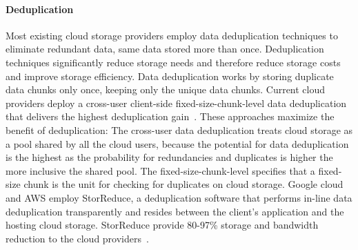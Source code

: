 \paragraph{Deduplication}
Most existing cloud storage
providers employ data deduplication techniques to eliminate redundant data,
same data stored more than once.  Deduplication techniques significantly reduce
storage needs and therefore reduce storage costs and improve storage
efficiency.  Data deduplication works by storing duplicate data chunks only
once, keeping only the unique data chunks. 
Current cloud providers deploy a
cross-user client-side fixed-size-chunk-level data deduplication that delivers
the highest deduplication gain~\cite{pooranian2018rare}.  These approaches
maximize the benefit of deduplication: The cross-user data deduplication treats
cloud storage as a pool shared by all the cloud users, because the potential
for data deduplication is the highest as the probability for redundancies and
duplicates is higher the more inclusive the shared pool.  The
fixed-size-chunk-level specifies that a fixed-size chunk is the unit for
checking for duplicates on cloud storage.  Google cloud and AWS employ
StorReduce, a deduplication software that performs in-line data deduplication
transparently and resides between the client's application and the hosting
cloud storage. StorReduce provide 80-97\% storage and bandwidth reduction to
the cloud providers~\cite{StorReduce_google}.  


